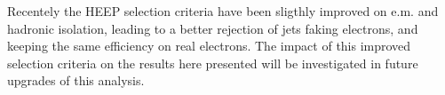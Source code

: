 \documentclass[colclass=cmspaper]{combine}
\begin{document}
\begin{linenumbers}
Recentely the HEEP selection criteria have been sligthly improved on e.m. and hadronic isolation, 
leading to a better rejection of jets faking electrons, and keeping the same efficiency on real electrons.
The impact of this improved selection criteria on the results here presented will be investigated in 
future upgrades of this analysis. 


 




\end{linenumbers}
\end{document}
